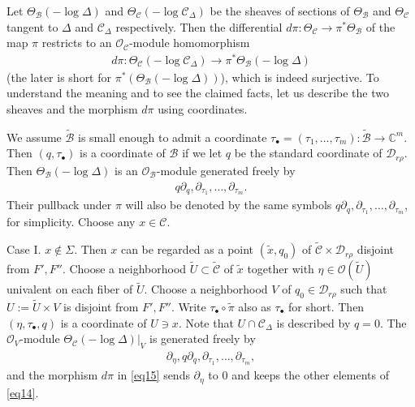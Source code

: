 \documentclass[12pt,a4paper,notitlepage]{article}
\theoremstyle{definition}
\theoremstyle{plain}
\newcommand{\mc}{\mathcal}
\newcommand{\wtd}{\widetilde}
\newcommand{\scr}{\mathscr}
\newcommand{\blt}{\bullet}
\newcommand{\Cbb}{\mathbb C}
\numberwithin{equation}{section}
\begin{document}
Let $\Theta_{\mc B}(-\log\Delta)$ and $\Theta_{\mc C}(-\log\mc C_\Delta)$ \index{zz@$\Theta_{\mc B}(-\log\Delta)$} \index{zz@$\Theta_{\mc C}(-\log\mc C_\Delta)$} be  the sheaves of sections of $\Theta_{\mc B}$ and $\Theta_{\mc C}$ tangent to $\Delta$ and $\mc C_\Delta$ respectively. Then the differential $d\pi:\Theta_{\mc C}\rightarrow\pi^*\Theta_{\mc B}$ of the map $\pi$ restricts to an $\scr O_{\mc C}$-module homomorphism
\begin{align}
d\pi:\Theta_{\mc C}(-\log\mc C_\Delta)\rightarrow \pi^*\Theta_{\mc B}(-\log\Delta)\label{eq15}
\end{align}
(the later is short for $\pi^*(\Theta_{\mc B}(-\log\Delta))$), which is indeed surjective. To understand the meaning and to see the claimed facts, let us describe the two sheaves and the morphism $d\pi$ using coordinates.

We assume $\wtd{\mc B}$ is small enough  to admit a  coordinate \index{zz@$\tau_\blt$} $\tau_\blt=(\tau_1,\dots,\tau_m):\wtd{\mc B}\rightarrow\Cbb^m$.  Then $(q,\tau_\blt)$ is a coordinate of $\mc B$ if we let $q$ be the standard coordinate of $\mc D_{r\rho}$. Then  $\Theta_{\mc B}(-\log\Delta)$ is an $\scr O_{\mc B}$-module generated freely by
\begin{align*}
q\partial_q,\partial_{\tau_1},\dots,\partial_{\tau_m}.
\end{align*}
Their pullback under $\pi$ will also be denoted by the same symbols $q\partial_q,\partial_{\tau_1},\dots,\partial_{\tau_m}$, for simplicity. Choose any $x\in\mc C$. 

Case I. $x\notin\Sigma$. Then $x$ can be regarded as a point  $(\wtd x,q_0)$ of $\wtd{\mc C}\times \mc D_{r\rho}$ disjoint from $F',F''$. Choose a neighborhood $\wtd U\subset\wtd{\mc C}$ of $\wtd x$ together with $\eta\in\scr O(\wtd U)$ univalent on each fiber of $\wtd U$. Choose a neighborhood $V$ of $q_0\in\mc D_{r\rho}$ such that $U:=\wtd U\times V$ is disjoint from $F',F''$. Write $\tau_\blt\circ\wtd\pi$ also as $\tau_\blt$ for short. Then $(\eta,\tau_\blt,q)$ is a coordinate of $U\ni x$. Note that $U\cap\mc C_\Delta$ is described by $q=0$.  The  $\scr O_V$-module $\Theta_{\mc C}(-\log\Delta)|_V$ is generated freely by
\begin{align}
\partial_\eta,q\partial_q,\partial_{\tau_1},\dots,\partial_{\tau_m},\label{eq14}
\end{align} 
and the morphism $d\pi$ in \eqref{eq15}  sends $\partial_\eta$ to $0$ and keeps the other elements of \eqref{eq14}. 
\end{document}
